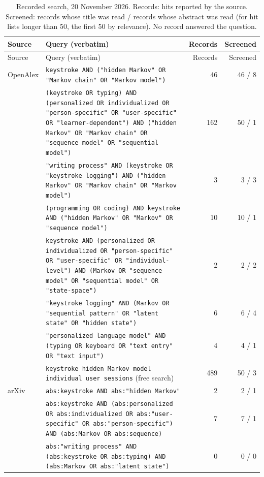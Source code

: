 \documentclass[10pt]{article}
\begin{document}
\begin{small}
\begin{longtable}{>{\raggedright}p{2.3cm}>{\raggedright}p{8.6cm}rr}
\caption{Recorded search, 20 November 2026. Records: hits reported by the source. Screened: records whose title was read / records whose abstract was read (for hit lists longer than 50, the first 50 by relevance). No record answered the question.}\label{tab:search}\\
\toprule
Source & Query (verbatim) & Records & Screened \\
\midrule\endfirsthead
\toprule
Source & Query (verbatim) & Records & Screened \\
\midrule\endhead
OpenAlex\footnotemark[1] & \texttt{keystroke AND ("hidden Markov" OR "Markov chain" OR "Markov model")} & 46 & 46 / 8 \\
 & \texttt{(keystroke OR typing) AND (personalized OR individualized OR "person-specific" OR "user-specific" OR "learner-dependent") AND ("hidden Markov" OR "Markov chain" OR "sequence model" OR "sequential model")} & 162 & 50 / 1 \\
 & \texttt{"writing process" AND (keystroke OR "keystroke logging") AND ("hidden Markov" OR "Markov chain" OR "Markov model")} & 3 & 3 / 3 \\
 & \texttt{(programming OR coding) AND keystroke AND ("hidden Markov" OR "Markov" OR "sequence model")} & 10 & 10 / 1 \\
 & \texttt{keystroke AND (personalized OR individualized OR "person-specific" OR "user-specific" OR "individual-level") AND (Markov OR "sequence model" OR "sequential model" OR "state-space")} & 2 & 2 / 2 \\
 & \texttt{"keystroke logging" AND (Markov OR "sequential pattern" OR "latent state" OR "hidden state")} & 6 & 6 / 4 \\
 & \texttt{"personalized language model" AND (typing OR keyboard OR "text entry" OR "text input")} & 4 & 4 / 1 \\
 & \texttt{keystroke hidden Markov model individual user sessions} (free search) & 489 & 50 / 3 \\
arXiv\footnotemark[2] & \texttt{abs:keystroke AND abs:"hidden Markov"} & 2 & 2 / 1 \\
 & \texttt{abs:keystroke AND (abs:personalized OR abs:individualized OR abs:"user-specific" OR abs:"person-specific") AND (abs:Markov OR abs:sequence)} & 7 & 7 / 1 \\
 & \texttt{abs:"writing process" AND (abs:keystroke OR abs:typing) AND (abs:Markov OR abs:"latent state")} & 0 & 0 / 0 \\

\end{longtable}
\end{small}
\end{document}
